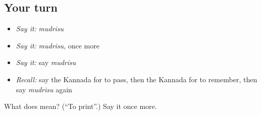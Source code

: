 \subsection*{Your turn}
\begin{itemize}
\raggedright
  \item \emph{Say it:} \emph{mudrisu}
  \item \emph{Say it:} \emph{mudrisu}, once more
  \item \emph{Say it:} say \emph{mudrisu}
  \item \emph{Recall:} say the Kannada for to pass, then the Kannada for to remember, then say \emph{mudrisu} again
\end{itemize}

\begin{tcolorbox}[breakable,colback=teal!4,colframe=teal!35!black,title={Before you move on}]
What does  mean? (\textquotedblleft{}To print\textquotedblright{}.) Say it once more.
\end{tcolorbox}
